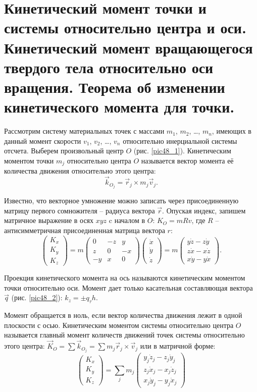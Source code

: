 \chapter{Кинетический момент точки и системы относительно центра и оси.
Кинетический момент вращающегося твердого тела относительно оси вращения.
Теорема об изменении кинетического момента для точки.}

Рассмотрим систему материальных точек с массами \( m_1 \), \( m_2 \), \ldots,
\( m_n \), имеющих в данный момент скорости \( v_1 \), \( v_2 \), \ldots,
\( v_n \) относительно инерциальной системы отсчета. Выберем произвольный центр
\( O \) (рис. \ref{pic48_1}). Кинетическим моментом точки \( m_j \) относительно центра \( O \)
называется вектор момента её количества движения относительно этого центра:
\[
    \vec{k}_{O_j} = \vec{r}_j \times m_j\vec{v}_j.
\]

Известно, что векторное умножение можно записать через присоединенную матрицу
первого сомножителя -- радиуса вектора \( \vec{r} \). Опуская индекс, запишем
матричное выражение в осях \( xyz \) c началом в \( O \): \( K_O = mRv \), где
\( R \) -- антисимметричная присоединенная матрица вектора \( r \):
\[
    \begin{pmatrix} K_x \\ K_y \\ K_z \end{pmatrix} =
    m\begin{pmatrix} 0 & -z & y \\ z & 0 & -x \\ -y & x & 0 \end{pmatrix}
    \begin{pmatrix} \dot{x} \\ \dot{y} \\ \dot{z} \end{pmatrix} = 
    m\begin{pmatrix} y\dot{z} - z\dot{y} \\ z\dot{x} - x\dot{z} \\
    x\dot{y} - y\dot{x} \end{pmatrix}.
\]
 
Проекция кинетического момента на ось называются кинетическим моментом точки
относительно оси. Момент дает только касательная составляющая вектора
\( \vec{q} \) (рис. \ref{pic48_2}): \( k_z = \pm q_\tau h \).

Момент обращается в ноль, если вектор количества движения лежит в одной
плоскости с осью. Кинетическим моментом системы относительно центра \( O \)
называется главный момент количеств движений точек системы относительно этого
центра: \( \vec{K}_O = \sum \vec{k}_{O_j} = \sum m_j \vec{r}_j \times
\vec{v}_j \) или в матричной форме:
\[
    \begin{pmatrix} K_x \\ K_y \\ K_z \end{pmatrix} = \sum_j m_j
    \begin{pmatrix} y_j\dot{z}_j - z_j\dot{y}_j \\ z_j\dot{x}_j - x_j\dot{z}_j
    \\ x_j\dot{y}_j - y_j\dot{x}_j \end{pmatrix}
\]

